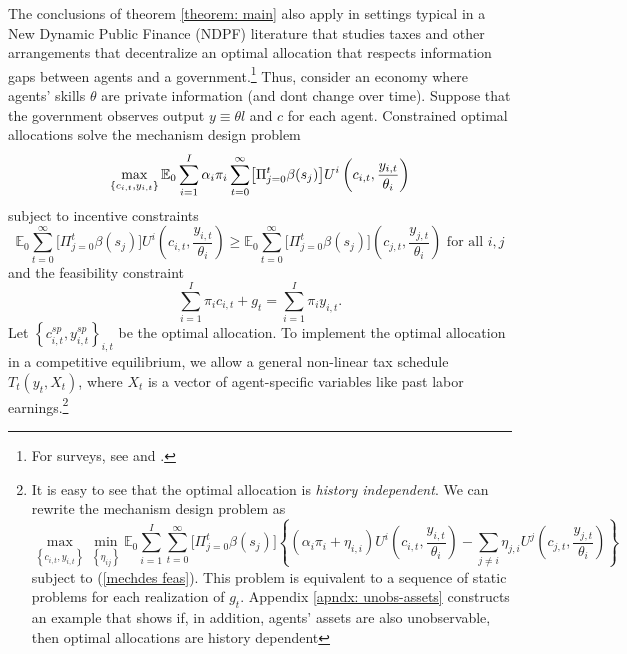 \documentclass[thmsb,11pt]{article}
\begin{document}
The conclusions  of theorem \ref{theorem: main} also apply in settings typical in  a New Dynamic Public Finance (NDPF)  literature that studies taxes and other arrangements that  decentralize an optimal allocation that respects information gaps between agents and a government.\footnote{%
For surveys, see \citet{golosov2007new} and \cite{kocherlakota2010new}.}
Thus, consider an economy where agents' skills $\theta$ are private information (and dont change over time).  Suppose
that the government observes output $y\equiv \theta l$ and $c$ for each
agent. Constrained optimal allocations solve the mechanism design problem
\begin{equation}
\max_{\left \{ c_{i,t},y_{i,t}\right \} }\mathbb{E}_{0}\sum_{i=1}^{I}\alpha
_{i}\pi _{i}\sum_{t=0}^{\infty } \bigl[\Pi_{j=0}^t \beta(s_j)\bigr] U^{i}\left( c_{i,t},\frac{y_{i,t}}{%
\theta _{i}}\right)  \label{mechdes max}
\end{equation}%
subject to incentive constraints%
\begin{equation}
\mathbb{E}_{0}\sum_{t=0}^{\infty }\bigl[\Pi_{j=0}^t \beta(s_j)\bigr]U^{i}\left( c_{i,t},\frac{y_{i,t}%
}{\theta _{i}}\right) \geq \mathbb{E}_{0}\sum_{t=0}^{\infty }\bigl[\Pi_{j=0}^t \beta(s_j)\bigr]\left( c_{j,t},\frac{y_{j,t}}{\theta _{i}}\right) \text{ for all }%
i,j  \label{mechdes IC}
\end{equation}%
and the feasibility constraint%
\begin{equation}
\sum_{i=1}^{I}\pi _{i}c_{i,t}+g_{t}=\sum_{i=1}^{I}\pi _{i}y_{i,t}.
\label{mechdes feas}
\end{equation}%
Let $\left \{ c_{i,t}^{sp},y_{i,t}^{sp}\right \} _{i,t}$ be the optimal allocation. To implement the optimal allocation
in a competitive equilibrium, we allow a general
non-linear tax schedule $T_{t}\left( y_{t},X_{t}\right) $, where $X_{t}$ is a vector
of  agent-specific variables like past labor earnings.\footnote{It is easy to see that the optimal allocation is \emph{history independent}. We can rewrite the mechanism design problem as
\begin{equation*}
\max_{\left \{ c_{i,t},y_{i,t}\right \} }\min_{\left \{ \eta _{ij}\right \} }%
\mathbb{E}_{0}\sum_{i=1}^{I}\sum_{t=0}^{\infty } \bigl[\Pi_{j=0}^t \beta(s_j)\bigr]\left\{\left( \alpha _{i}\pi _{i}+\eta
_{i,i}\right) U^{i}\left( c_{i,t},\frac{y_{i,t}}{\theta _{i}}\right)
-\sum_{j\neq i}\eta _{j,i}U^{j}\left( c_{j,t},\frac{y_{j,t}}{\theta _{i}}%
\right)\right\} 
\end{equation*}%
subject to (\ref{mechdes feas}). This problem is equivalent to a sequence of
static problems for each realization of $g_{t}.$
Appendix \ref{apndx: unobs-assets} constructs an example that shows if, in addition, agents' assets are also unobservable, then optimal allocations are history dependent}
\end{document}
